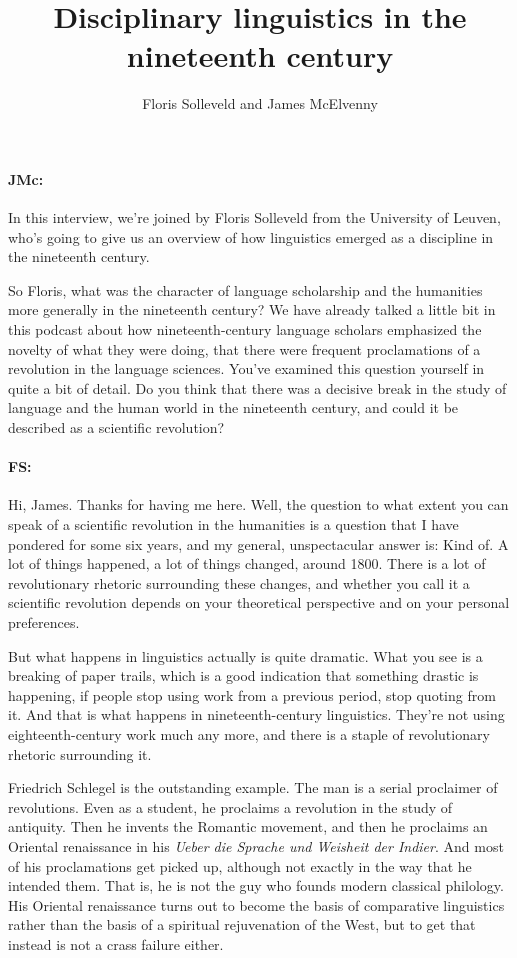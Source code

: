 \documentclass[output=paper]{langscibook}
\author{Floris Solleveld\orcid{}\affiliation{University of Leuven} and James McElvenny\affiliation{University of Siegen}}
\title{Disciplinary linguistics in the nineteenth century}
\begin{document}
\maketitle 


\paragraph*{JMc:}  In this interview, we’re joined by Floris Solleveld from the University of Leuven, who’s going to give us an overview of how linguistics emerged as a discipline in the nineteenth century.

So Floris, what was the character of language scholarship and the humanities more generally in the nineteenth century? We have already talked a little bit in this podcast about how nineteenth-century language scholars emphasized the novelty of what they were doing, that there were frequent proclamations of a revolution in the language sciences. You’ve examined this question yourself in quite a bit of detail. Do you think that there was a decisive break in the study of language and the human world in the nineteenth century, and could it be described as a scientific revolution?


\paragraph*{FS:}  Hi, James. Thanks for having me here. Well, the question to what extent you can speak of a scientific revolution in the humanities is a question that I have pondered for some six years, and my general, unspectacular answer is: Kind of. A lot of things happened, a lot of things changed, around 1800. There is a lot of revolutionary rhetoric surrounding these changes, and whether you call it a scientific revolution depends on your theoretical perspective and on your personal preferences.

But what happens in linguistics actually is quite dramatic. What you see is a breaking of paper trails, which is a good indication that something drastic is happening, if people stop using work from a previous period, stop quoting from it. And that is what happens in nineteenth-century linguistics. They’re not using eighteenth-century work much any more, and there is a staple of revolutionary rhetoric surrounding it. 

Friedrich Schlegel is the outstanding example. The man is a serial proclaimer of revolutions. Even as a student, he proclaims a revolution in the study of antiquity. Then he invents the Romantic movement, and then he proclaims an Oriental renaissance in his \textit{Ueber die Sprache und Weisheit der Indier}. And most of his proclamations get picked up, although not exactly in the way that he intended them. That is, he is not the guy who founds modern classical philology. His Oriental renaissance turns out to become the basis of comparative linguistics rather than the basis of a spiritual rejuvenation of the West, but to get that instead is not a crass failure either. 
\end{document}
